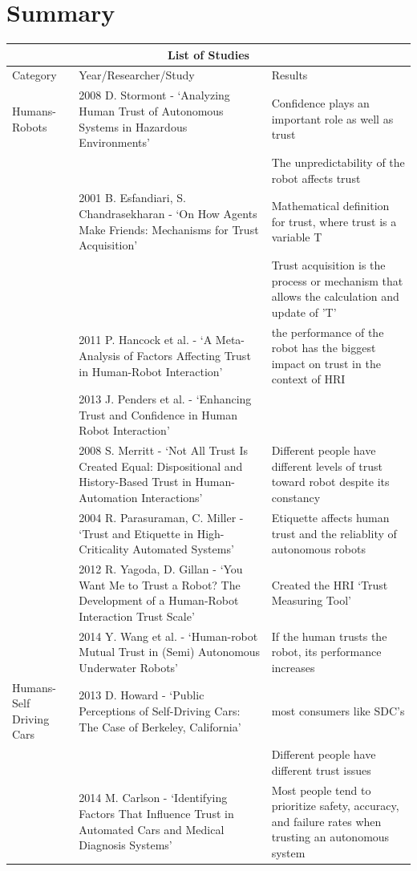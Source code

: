 \documentclass[runningheads,a4paper]{llncs}
\begin{document}
\section{Summary}

\begin{center}
	

\begin{tabular}{ |p{2cm}|p{4cm}|p{6cm}|  }
\hline
\multicolumn{3}{|c|}{List of Studies} \\
\hline
Category & Year/Researcher/Study & Results \\
\hline
Humans-Robots & 2008 D. Stormont - `Analyzing Human Trust of Autonomous Systems in Hazardous Environments' & Confidence plays an important role as well as trust\\
 & & The unpredictability of the robot affects trust \\
\hline
 & 2001 B. Esfandiari, S. Chandrasekharan - `On How Agents Make Friends: Mechanisms for Trust Acquisition' & Mathematical definition for trust, where trust is a variable T\\
 & & Trust acquisition is the process or mechanism that allows the calculation and update of 'T' \\
\hline
& 2011 P. Hancock et al. - `A Meta-Analysis of Factors Affecting Trust in Human-Robot Interaction' & the performance of the robot has the biggest impact on trust in the context of HRI\\
\hline
& 2013 J. Penders et al. - `Enhancing Trust and Confidence in Human Robot Interaction' &  \\
\hline
& 2008 S. Merritt - `Not All Trust Is Created Equal: Dispositional and History-Based Trust in Human-Automation Interactions' & Different people have different levels of trust toward robot despite its constancy\\
\hline
& 2004 R. Parasuraman, C. Miller - `Trust and Etiquette in High-Criticality Automated Systems' & Etiquette affects human trust and the reliablity of autonomous robots\\
\hline
& 2012 R. Yagoda, D. Gillan - `You Want Me to Trust a Robot? The Development of a Human-Robot Interaction Trust Scale' & Created the HRI `Trust Measuring Tool'\\
\hline
& 2014 Y. Wang et al. - `Human-robot Mutual Trust in (Semi) Autonomous Underwater Robots' & If the human trusts the robot, its performance increases\\
\hline
Humans-Self Driving Cars & 2013 D. Howard - `Public Perceptions of Self-Driving Cars: The Case of Berkeley, California' & most consumers like SDC's\\
 & & Different people have different trust issues\\
\hline
& 2014 M. Carlson - `Identifying Factors That Influence Trust in Automated Cars and Medical Diagnosis Systems' & Most people tend to prioritize safety, accuracy, and failure rates when trusting an autonomous system\\
\hline
\end{tabular}


\end{center}
\end{document}
